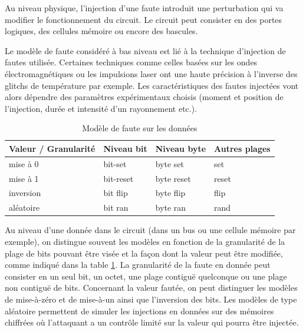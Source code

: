                 Au niveau physique, l'injection d'une faute introduit une perturbation qui va modifier le fonctionnement du circuit. Le circuit peut consister en des portes logiques, des cellules mémoire ou encore des bascules.
                
                Le modèle de faute considéré à bas niveau est lié à la technique d'injection de fautes utilisée. Certaines techniques comme celles basées sur les ondes électromagnétiques \cite{Maistri/VLSI-SoC14, Dument/FDTC19} ou les impulsions laser \cite{Van/FDTC11, Dutertre/DTIS14} ont une haute précision à l'inverse des glitchs de température \cite{Hutter/ICSCRAA13} par exemple.
                Les caractéristiques des fautes injectées vont alors dépendre des paramètres expérimentaux choisis (moment et position de l'injection, durée et intensité d'un rayonnement etc.).
                
                \begin{table}[ht]
                \centering
                    \begin{tabular}{|l|l|l|l|}
                    \hline
                    Valeur / Granularité & Niveau bit & Niveau byte & Autres plages \\ \hline \hline
                    mise à 0                             & bit-set       & byte set        & set          \\ \hline
                    mise à 1                             & bit-reset     & byte reset      & reset        \\ \hline
                    inversion                            & bit flip   & byte flip       & flip         \\ \hline
                    aléatoire                            & bit ran    & byte ran       & rand    \\    \hline
                    \end{tabular}               
                \caption{Modèle de faute sur les données \label{tbl:bits}}
                \end{table}
                
                Au niveau d'une donnée dans le circuit (dans un bus ou une cellule mémoire par exemple), on distingue souvent les modèles en fonction de la granularité de la plage de bits pouvant être visée et la façon dont la valeur peut être modifiée, comme indiqué dans la table \ref{tbl:bits}.
                La granularité de la faute en donnée peut consister en un seul bit, un octet, une plage contiguë quelconque ou une plage non contiguë de bits.
                Concernant la valeur fautée, on peut distinguer les modèles de mise-à-zéro et de mise-à-un ainsi que l'inversion des bits. 
                Les modèles de type aléatoire permettent de simuler les injections en données sur des mémoires chiffrées où l'attaquant a un contrôle limité sur la valeur qui pourra être injectée. 
            
